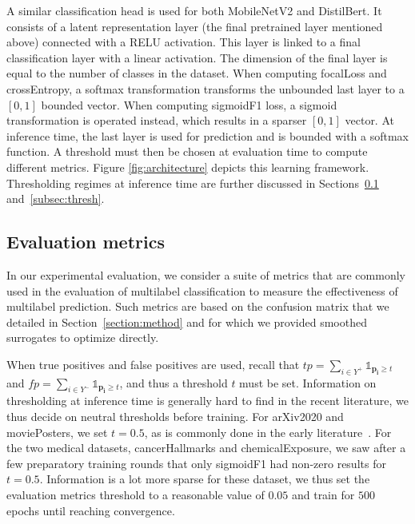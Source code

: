 A similar classification head is used for both MobileNetV2 and DistilBert. It consists of a latent representation layer (the final pretrained layer mentioned above) connected with a RELU activation. This layer is linked to a final classification layer with a linear activation. The dimension of the final layer is equal to the number of classes in the dataset. When computing focalLoss and crossEntropy, a softmax transformation transforms the unbounded last layer to a $[0,1]$ bounded vector. When computing sigmoidF1 loss, a sigmoid transformation is operated instead, which results in a sparser $[0,1]$ vector. At inference time, the last layer is used for prediction and is bounded with a softmax function. A threshold must then be chosen at evaluation time to compute different metrics. Figure \ref{fig:architecture} depicts this learning framework. Thresholding regimes at inference time are further discussed in Sections~\ref{sec:evalMetrics} and~\ref{subsec:thresh}.



\subsection{Evaluation metrics}
\label{sec:evalMetrics}

In our experimental evaluation, we consider a suite of metrics that are commonly used in the evaluation of multilabel classification to measure the effectiveness of multilabel prediction. Such metrics are based on the confusion matrix that we detailed in Section~\ref{section:method} and for which we provided smoothed surrogates to optimize directly.

When true positives and false positives are used, recall that \(t p=\sum_{i \in Y^{+}} \mathds{1}_{\mathbf{p_i} \geq t}\) and \(f p=\sum_{i \in Y^{-}} \mathds{1}_{\mathbf{p_i} \geq t}\), and thus a threshold \(t\) must be set. Information on thresholding at inference time is generally hard to find in the recent literature, we thus decide on neutral thresholds before training. For arXiv2020 and moviePosters, we set \(t = 0.5\), as is commonly done in the early literature~\cite{multilabelReview, ML-DT}.
For the two medical datasets, cancerHallmarks and chemicalExposure, we saw after a few preparatory training rounds that only sigmoidF1 had non-zero results for \(t = 0.5\). Information is a lot more sparse for these dataset, we thus set the evaluation metrics threshold to a reasonable value of $0.05$ and train for $500$ epochs until reaching convergence.

